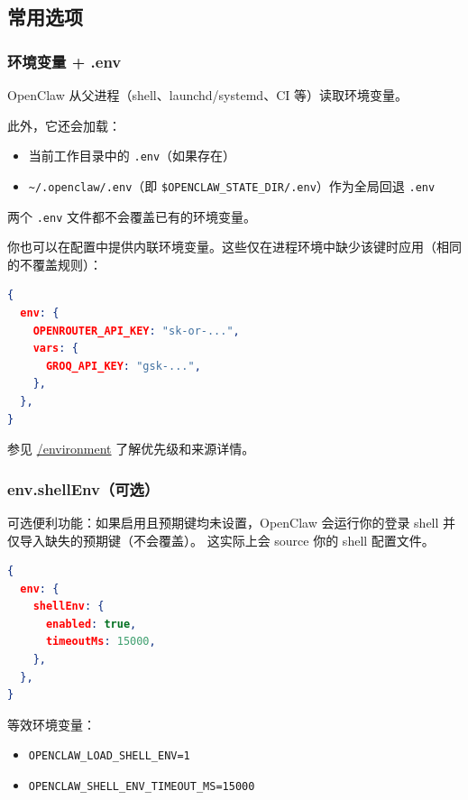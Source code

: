\subsection{常用选项}


\subsubsection{环境变量 + .env}


OpenClaw 从父进程（shell、launchd/systemd、CI 等）读取环境变量。

此外，它还会加载：

\begin{itemize}
  \item 当前工作目录中的 \texttt{.env}（如果存在）
  \item \texttt{\textasciitilde{}/.openclaw/.env}（即 \texttt{\$OPENCLAW\_STATE\_DIR/.env}）作为全局回退 \texttt{.env}
\end{itemize}


两个 \texttt{.env} 文件都不会覆盖已有的环境变量。

你也可以在配置中提供内联环境变量。这些仅在进程环境中缺少该键时应用（相同的不覆盖规则）：

\begin{lstlisting}[language=json]
{
  env: {
    OPENROUTER_API_KEY: "sk-or-...",
    vars: {
      GROQ_API_KEY: "gsk-...",
    },
  },
}
\end{lstlisting}


参见 \href{/help/environment}{/environment} 了解优先级和来源详情。

\subsubsection{env.shellEnv（可选）}


可选便利功能：如果启用且预期键均未设置，OpenClaw 会运行你的登录 shell 并仅导入缺失的预期键（不会覆盖）。
这实际上会 source 你的 shell 配置文件。

\begin{lstlisting}[language=json]
{
  env: {
    shellEnv: {
      enabled: true,
      timeoutMs: 15000,
    },
  },
}
\end{lstlisting}


等效环境变量：

\begin{itemize}
  \item \texttt{OPENCLAW\_LOAD\_SHELL\_ENV=1}
  \item \texttt{OPENCLAW\_SHELL\_ENV\_TIMEOUT\_MS=15000}
\end{itemize}



